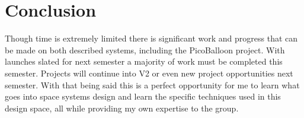 \section{Conclusion}
Though time is extremely limited there is significant work and progress that can be made on both described systems, including the PicoBalloon project. With launches slated for next semester a majority of work must be completed this semester. Projects will continue into V2 or even new project opportunities next semester. With that being said this is a perfect opportunity for me to learn what goes into space systems design and learn the specific techniques used in this design space, all while providing my own expertise to the group.